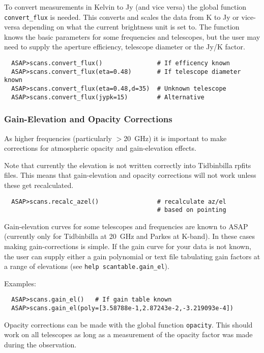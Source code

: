 \documentclass[11pt]{article}
\newcommand{\cmd}[1]{{\tt #1}}
\begin{document}
To convert measurements in Kelvin to Jy (and
vice versa) the global function \cmd{convert\_flux} is needed. This
converts and scales the data from K to Jy or vice-versa depending on
what the current brightness unit is set to. The function knows the
basic parameters for some frequencies and telescopes, but the user may
need to supply the aperture efficiency, telescope diameter or the Jy/K
factor.

\begin{verbatim}
  ASAP>scans.convert_flux()               # If efficency known
  ASAP>scans.convert_flux(eta=0.48)       # If telescope diameter known
  ASAP>scans.convert_flux(eta=0.48,d=35)  # Unknown telescope
  ASAP>scans.convert_flux(jypk=15)        # Alternative
\end{verbatim}

\subsubsection{Gain-Elevation and Opacity Corrections}
\label{sec:gainel}

As higher frequencies (particularly $>$20~GHz)
it is important to make corrections for atmospheric opacity and
gain-elevation effects.

Note that currently the elevation is not written correctly into
Tidbinbilla rpfits files. This means that gain-elevation and opacity
corrections will not work unless these get recalculated.

\begin{verbatim}
  ASAP>scans.recalc_azel()                # recalculate az/el 
              							  # based on pointing
\end{verbatim}

Gain-elevation curves for some telescopes and frequencies are known to
ASAP (currently only for Tidbinbilla at 20~GHz and Parkes at K-band). 
In these cases making gain-corrections is simple.  If the gain curve for your
data is not known, the user can supply either a gain polynomial or text file
tabulating gain factors at a range of elevations (see \cmd{help
scantable.gain\_el}).

Examples:

\begin{verbatim}
  ASAP>scans.gain_el()   # If gain table known
  ASAP>scans.gain_el(poly=[3.58788e-1,2.87243e-2,-3.219093e-4])
\end{verbatim}

Opacity corrections can be made with the global
function \cmd{opacity}. This should work on all telescopes as long as
a measurement of the opacity factor was made during the observation.
\end{document}
